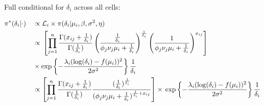 Full conditional for $\delta_i$ across all cells:
\begin{fleqn}
\begin{align*}
&\pi^*(\delta_i|\cdot)&&\propto{} \mathcal{L}_i\times\pi(\delta_i|\mu_i,\beta,\sigma^2,\eta)\\
& &&\propto{}\left[\prod_{j=1}^n\frac{\Gamma(x_{ij}+\frac{1}{\delta_i})}{\Gamma(\frac{1}{\delta_i})}\left(\frac{\frac{1}{\delta_i}}{\phi_j\nu_j\mu_i+\frac{1}{\delta_i}}\right)^\frac{1}{\delta_i}\left(\frac{1}{\phi_j\nu_j\mu_i+\frac{1}{\delta_i}}\right)^{x_{ij}}\right]\\
& &&\times\exp\left\lbrace-\frac{\lambda_i(\log(\delta_i)-f(\mu_i))^2}{2\sigma^2}\right\rbrace\frac{1}{\delta_i}\\
& &&\propto\left[\prod_{j=1}^n\frac{\Gamma(x_{ij}+\frac{1}{\delta_i})}{\Gamma(\frac{1}{\delta_i})}\frac{(\frac{1}{\delta_i})^{\frac{1}{\delta_i}}}{(\phi_j\nu_j\mu_i+\frac{1}{\delta_i})^{\frac{1}{\delta_i}+x_{ij}}}\right]\times{}\exp\left\lbrace-\frac{\lambda_i(\log(\delta_i)-f(\mu_i))^2}{2\sigma^2}\right\rbrace\frac{1}{\delta_i}\\
\end{align*}
\end{fleqn}

